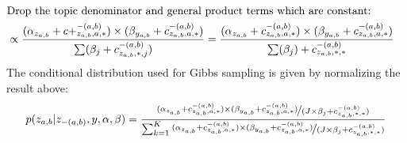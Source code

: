 \documentclass{article}%
\theoremstyle{definition}
\begin{document}
\begin{align}
    \intertext{Drop the topic denominator and general product terms which are constant:}
        &\propto \frac{(\alpha_{z_{a,b}}+ c+_{z_{a,b},a,*}^{-(a,b)})\times(\beta_{y_{a,b}}+c_{z_{a,b},a,*}^{-(a,b)})}{\sum(\beta_j + c_{z_{a,b},*,j}^{-(a,b)})} = \frac{(\alpha_{z_{a,b}}+ c_{z_{a,b},a,*}^{-(a,b)})\times(\beta_{y_{a,b}}+c_{z_{a,b},a,*}^{-(a,b)})}{\sum(\beta_j) + c_{z_{a,b},*,*}^{-(a,b)}}
\end{align}
The conditional distribution used for Gibbs sampling is given by normalizing the result above:
\begin{equation}
p(z_{a,b}|z_{-(a,b)},y,\alpha,\beta) = \frac{\nicefrac{(\alpha_{z_{a,b}}+ c_{z_{a,b},a,*}^{-(a,b)})\times(\beta_{y_{a,b}}+c_{z_{a,b},a,*}^{-(a,b)})}{(J \times \beta_j + c_{z_{a,b},*,*}^{-(a,b)})}}{\sum_{k=1}^{K}\nicefrac{(\alpha_{z_{a,b}}+ c_{z_{a,b},a,*}^{-(a,b)})\times(\beta_{y_{a,b}}+c_{z_{a,b},a,*}^{-(a,b)})}{(J \times \beta_j + c_{z_{a,b},*,*}^{-(a,b)})}}
\end{equation}
\end{document}
